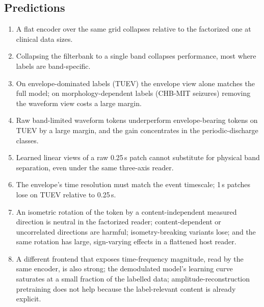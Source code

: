 \subsection{Predictions}
\label{sec:predictions}
\begin{enumerate}[label=\textbf{P\arabic*}]
\item A flat encoder over the same grid collapses relative to the factorized one at clinical data sizes.
\item Collapsing the filterbank to a single band collapses performance, most where labels are band-specific.
\item On envelope-dominated labels (TUEV) the envelope view alone matches the full model; on morphology-dependent labels (CHB-MIT seizures) removing the waveform view costs a large margin.
\item Raw band-limited waveform tokens underperform envelope-bearing tokens on TUEV by a large margin, and the gain concentrates in the periodic-discharge classes.
\item Learned linear views of a raw 0.25\,s patch cannot substitute for physical band separation, even under the same three-axis reader.
\item The envelope's time resolution must match the event timescale; 1\,s patches lose on TUEV relative to 0.25\,s.
\item An isometric rotation of the token by a content-independent measured direction is neutral in the factorized reader; content-dependent or uncorrelated directions are harmful; isometry-breaking variants lose; and the same rotation has large, sign-varying effects in a flattened host reader.
\item A different frontend that exposes time-frequency magnitude, read by the same encoder, is also strong; the demodulated model's learning curve saturates at a small fraction of the labelled data; amplitude-reconstruction pretraining does not help because the label-relevant content is already explicit.
\end{enumerate}
